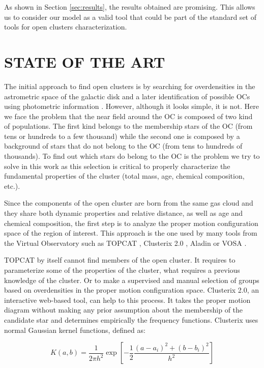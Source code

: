 \documentclass[11pt,a4paper,USenglish,twocolumn]{article}
\begin{document}
As shown in Section \ref{sec:results}, the results obtained are promising.
This allows us to consider our model as a valid tool that could be part
of the standard set of tools for open clusters characterization.

\section{STATE OF THE ART}

The initial approach to find open clusters is by searching for overdensities
in the astrometric space of the galactic disk and a later identification of
possible OCs using photometric information \cite{castro2020hunting}.
However, although it looks simple, it is not. Here we face the problem that the
near field around the OC is composed of two kind of populations.
The first kind belongs to the membership stars of the OC (from tens or hundreds
to a few thousand) while the second one is composed by a background of stars
that do not belong to the OC (from tens to hundreds of thousands).
To find out which stars do belong to the OC is the problem we try to solve in
this work as this selection is critical to properly characterize the
fundamental properties of the cluster (total mass, age, chemical composition, etc.).

Since the components of the open cluster are born from the same gas cloud and they
share both dynamic properties and relative distance, as well as age and chemical
composition, the first step is to analyze the proper motion configuration space of
the region of interest. This approach is the one used by many tools from the Virtual
Observatory such as TOPCAT \cite{taylor2005topcat}, Clusterix 2.0 \cite{balaguer2020clusterix},
Aladin \cite{bonnarel2000aladin} or VOSA \cite{bayo2008vosa}.

TOPCAT by itself cannot find members of the open cluster. It requires to parameterize
some of the properties of the cluster, what requires a previous knowledge of the cluster.
Or to make a supervised and manual selection of groups based on overdensities
in the proper motion configuration space. Clusterix 2.0, an interactive web-based tool,
can help to this process. It takes the proper motion diagram without making any prior
assumption about the membership of the candidate star and determines empirically
the frequency functions. Clusterix uses normal Gaussian kernel functions, defined as:

\begin{equation*}
  K(a, b) = \frac{1}{2 \pi h^{2}} \exp{ \left[ - \frac{1}{2}\frac{\left( a - a_{i} \right)^{2} + \left( b - b_{i} \right)^{2}}{ h^{2}} \right]}
\end{equation*}
\end{document}
